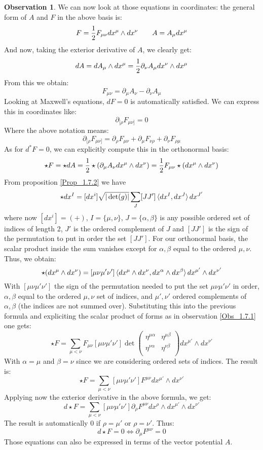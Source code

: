 \documentclass[12pt,a4paper]{report}
\theoremstyle{definition}
\theoremstyle{Theorem}
\theoremstyle{definition}
\theoremstyle{definition}
\newtheorem{Obs}[Def]{Observation}
\begin{document}
	\begin{Obs}
		We can now look at those equations in coordinates: the general form of $A$ and $F$ in the above basis is:
		$$F={1\over 2}F_{\mu\nu}dx^\mu\wedge dx^\nu\hspace{20 pt} A=A_\mu dx^\mu$$
		And now, taking the exterior derivative of $A$, we clearly get:
		$$dA=dA_\mu\wedge dx^\mu={1\over 2}\partial_\nu A_\mu dx^\nu\wedge dx^\mu$$
		From this we obtain:
		$$F_{\mu\nu}=\partial_\mu A_\nu-\partial_\nu A_\mu$$
		Looking at Maxwell's equations, $dF=0$ is automatically satisfied. We can express this in coordinates like:
		$$\partial_{[\rho} F_{\mu\nu]}=0$$
		Where the above notation means: $$\partial_{[\rho} F_{\mu\nu]}=\partial_\rho F_{\mu\nu}+\partial_\mu F_{\nu\rho}+\partial_\nu F_{\rho\mu}$$
		As for $d^*F=0$, we can explicitly compute this in the orthonormal basis:
		$$\star F=\star dA={1\over 2}\star(\partial_\mu A_\nu dx^\mu\wedge dx^\nu)={1\over 2}F_{\mu\nu}\star(dx^\mu\wedge dx^\nu)$$
		From proposition \ref{Prop_1.7.2} we have
		$$\star dx^I=[dx^i]\sqrt{|\det(g)|}\sum_J[JJ']\braket{dx^I,dx^J}dx^{J'}$$
		where now $[dx^i]=(+)$, $I=\{\mu,\nu\}$, $J=\{\alpha,\beta\}$ is any possible ordered set of indices of length 2, $J'$ is the ordered complement of $J$ and $[JJ']$ is the sign of the permutation to put in order the set $[JJ']$. For our orthonormal basis, the scalar product inside the sum vanishes except for $\alpha,\beta$ equal to the ordered $\mu,\nu$. Thus, we obtain:
		$$\star (dx^\mu\wedge dx^\nu)= [\mu\nu\mu'\nu']\braket{dx^\mu\wedge dx^\nu,dx^\alpha\wedge dx^\beta}dx^{\mu'}\wedge dx^{\nu'}$$
		With $[\mu\nu\mu'\nu']$ the sign of the permutation needed to put the set $\mu\nu\mu'\nu'$ in order, $\alpha,\beta$ equal to the ordered $\mu,\nu$ set of indices, and $\mu',\nu'$ ordered complements of $\alpha,\beta$ (the indices are not summed over). Substituting this into the previous formula and expliciting the scalar product of forms as in observation \ref{Obs_1.7.1} one gets:
		$$\star F=\sum_{\mu<\nu}F_{\mu\nu}[\mu\nu\mu'\nu']\det
		\begin{pmatrix}
			\eta^{\mu\alpha} & \eta^{\mu\beta}\\
			\eta^{\nu\alpha} & \eta^{\nu\beta}\\
		\end{pmatrix} dx^{\mu'}\wedge dx^{\nu'}$$
		With $\alpha=\mu$ and $\beta=\nu$ since we are considering ordered sets of indices. The result is:
		$$\star F=\sum_{\mu<\nu}[\mu\nu\mu'\nu']F^{\mu\nu}dx^{\mu'}\wedge dx^{\nu'}$$
		Applying now the exterior derivative in the above formula, we get:
		$$d\star F=\sum_{\mu<\nu}[\mu\nu\mu'\nu']\partial_\rho F^{\mu\nu}dx^\rho\wedge dx^{\mu'}\wedge dx^{\nu'}$$
		The result is automatically 0 if $\rho=\mu'$ or $\rho=\nu'$. Thus:
		$$d\star F=0\iff \partial_\mu F^{\mu\nu}=0$$
		Those equations can also be expressed in terms of the vector potential $A$.
	\end{Obs}
\end{document}
